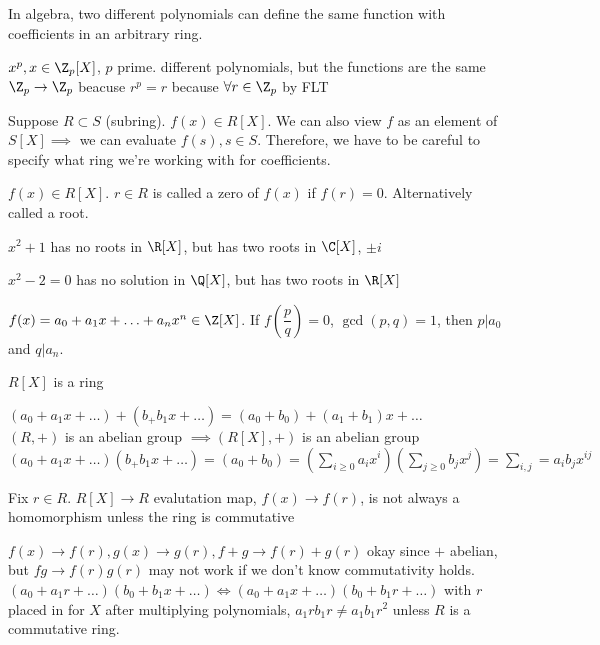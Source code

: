 \documentclass[10pt]{article}
\begin{document}
\begin{rmk}
    In algebra, two different polynomials can define the same function with coefficients in an arbitrary ring.
\end{rmk}

$x^p, x \in \Z_p[X]$, $p$ prime. different polynomials, but the functions are the same $\Z_p \to \Z_p$ beacuse $r^p = r$ because $\forall r \in \Z_p$ by FLT

Suppose $R \subset S$ (subring). $f(x) \in R[X]$. We can also view $f$ as an element of $S[X] \implies $ we can evaluate $f(s), s\in S$. Therefore, we have to be careful to specify what ring we're working with for coefficients.

\begin{defn}
    $f(x) \in R[X]$. $r \in R$ is called a zero of $f(x)$ if $f(r) = 0$. Alternatively called a root.
\end{defn}

$x^2 + 1$ has no roots in $\R[X]$, but has two roots in $\C[X]$, $\pm i$

$x^2 - 2 = 0$ has no solution in $\Q[X]$, but has two roots in $\R[X]$

\begin{defn}
    $f(x) = a_0 + a_1x + \ldots + a_nx^n \in \Z[X]$. If $f(\dfrac{p}{q}) = 0$, $\gcd(p, q) = 1$, then $p | a_0$ and $q | a_n$.
\end{defn}

\begin{lem}
    $R[X]$ is a ring
\end{lem}
$(a_0 + a_1x + \ldots) + (b_ + b_1x + \ldots) = (a_0 + b_0) + (a_1 + b_1)x + \ldots$\\
$(R, +)$ is an abelian group $\implies (R[X], +)$ is an abelian group\\
$(a_0 + a_1x + \ldots)(b_ + b_1x + \ldots) = (a_0 + b_0) = (\sum\limits_{i \geq 0} a_i x^i)(\sum\limits_{j \geq 0}b_jx^j) = \sum\limits_{i, j} = a_ib_jx^{ij}$

\begin{rmk}
    Fix $r \in R$. $R[X] \to R$ evalutation map, $f(x) \to f(r)$, is not always a homomorphism unless the ring is commutative
\end{rmk}
$f(x) \to f(r), g(x) \to g(r), f + g \to f(r) + g(r)$ okay since $+$ abelian, but $fg \to f(r)g(r)$ may not work if we don't know commutativity holds.
$(a_0 + a_1r +\ldots)(b_0 + b_1x + \ldots) \iff (a_0 + a_1x + \ldots)(b_0 + b_1r + \ldots)$ with $r$ placed in for $X$ after multiplying polynomials, $a_1rb_1r \neq a_1b_1r^2$ unless $R$ is a commutative ring.
\end{document}
